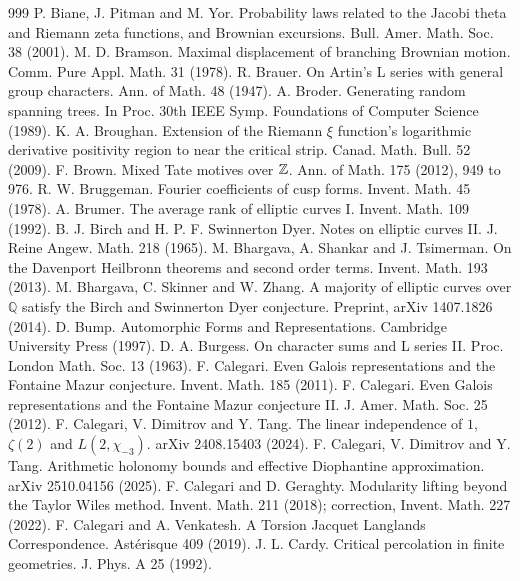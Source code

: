 \begin{thebibliography}{999}
 P. Biane, J. Pitman and M. Yor. Probability laws related to the Jacobi theta and Riemann zeta functions, and Brownian excursions. Bull. Amer. Math. Soc. 38 (2001).
 M. D. Bramson. Maximal displacement of branching Brownian motion. Comm. Pure Appl. Math. 31 (1978).
 R. Brauer. On Artin's L series with general group characters. Ann. of Math. 48 (1947).
 A. Broder. Generating random spanning trees. In Proc. 30th IEEE Symp. Foundations of Computer Science (1989).
 K. A. Broughan. Extension of the Riemann $\xi$ function's logarithmic derivative positivity region to near the critical strip. Canad. Math. Bull. 52 (2009).
 F. Brown. Mixed Tate motives over $\mathbb{Z}$. Ann. of Math. 175 (2012), 949 to 976.
 R. W. Bruggeman. Fourier coefficients of cusp forms. Invent. Math. 45 (1978).
 A. Brumer. The average rank of elliptic curves I. Invent. Math. 109 (1992).
 B. J. Birch and H. P. F. Swinnerton Dyer. Notes on elliptic curves II. J. Reine Angew. Math. 218 (1965).
 M. Bhargava, A. Shankar and J. Tsimerman. On the Davenport Heilbronn theorems and second order terms. Invent. Math. 193 (2013).
 M. Bhargava, C. Skinner and W. Zhang. A majority of elliptic curves over $\mathbb{Q}$ satisfy the Birch and Swinnerton Dyer conjecture. Preprint, arXiv 1407.1826 (2014).
 D. Bump. Automorphic Forms and Representations. Cambridge University Press (1997).
 D. A. Burgess. On character sums and L series II. Proc. London Math. Soc. 13 (1963).
 F. Calegari. Even Galois representations and the Fontaine Mazur conjecture. Invent. Math. 185 (2011).
 F. Calegari. Even Galois representations and the Fontaine Mazur conjecture II. J. Amer. Math. Soc. 25 (2012).
 F. Calegari, V. Dimitrov and Y. Tang. The linear independence of $1$, $\zeta(2)$ and $L(2,\chi_{-3})$. arXiv 2408.15403 (2024).
 F. Calegari, V. Dimitrov and Y. Tang. Arithmetic holonomy bounds and effective Diophantine approximation. arXiv 2510.04156 (2025).
 F. Calegari and D. Geraghty. Modularity lifting beyond the Taylor Wiles method. Invent. Math. 211 (2018); correction, Invent. Math. 227 (2022).
 F. Calegari and A. Venkatesh. A Torsion Jacquet Langlands Correspondence. Ast\'erisque 409 (2019).
 J. L. Cardy. Critical percolation in finite geometries. J. Phys. A 25 (1992).

\end{thebibliography}

